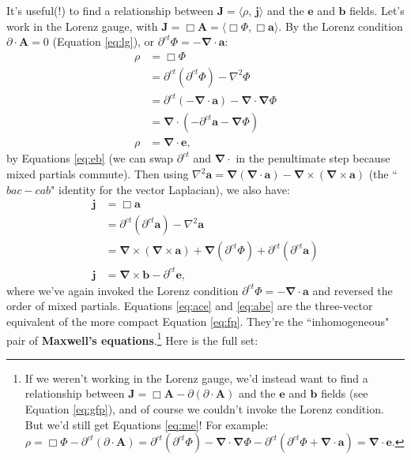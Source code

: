 \documentclass[12pt]{article}
\renewcommand{\vv}[1]{\mathbf{#1}}
\newcommand{\del}{\boldsymbol{\nabla}}
\begin{document}
It's useful(!) to find a relationship between $\vv J = \langle \rho, \, \vv j \rangle$ and the $\vv e$ and $\vv b$ fields. Let's work in the Lorenz gauge, with $\vv J= \Box \vv A = \langle \Box \Phi, \Box \vv a \rangle$. By the Lorenz condition ${\partialup \cdot \vv A = 0}$ (Equation \ref{eq:lg}), or $\partial^{ct} \Phi = - \del \cdot \vv a$:
\begin{equation}\label{eq:ace}
\begin{split}
\rho &= \Box \Phi \\
&= \partial^{ct} (\partial^{ct} \Phi) - \nabla ^2 \Phi \\
&= \partial^{ct} (- \del \cdot \vv a) - \del \cdot \del \Phi \\
&= \del \cdot (- \partial^{ct} \vv a - \del \Phi) \\
\rho &= \del \cdot \vv e ,
\end{split}
\end{equation}
by Equations \ref{eq:eb} (we can swap $\partial^{ct}$ and $\del \cdot$ in the penultimate step because mixed partials commute). Then using ${\nabla ^2 \vv a = \del(\del \cdot \vv a) - \del \times (\del \times \vv a)}$ (the ``$bac - cab$" identity for the vector Laplacian), we also have:
\begin{equation}\label{eq:abe}
\begin{split}
\vv j &= \Box \vv a \\
&= \partial^{ct} (\partial^{ct} \vv a) - \nabla ^2 \vv a \\
&= \del \times (\del \times \vv a) + \del(\partial^{ct} \Phi) + \partial^{ct} (\partial^{ct} \vv a) \\
\vv j &=  \del \times \vv b - \partial^{ct} \vv e ,
\end{split}
\end{equation}
where we've again invoked the Lorenz condition $\partial^{ct} \Phi = - \del \cdot \vv a$ and reversed the order of mixed partials. Equations \ref{eq:ace} and \ref{eq:abe} are the three-vector equivalent of the more compact Equation \ref{eq:fp}. They're the ``inhomogeneous" pair of \textbf{Maxwell's equations}.\footnote{If we weren't working in the Lorenz gauge, we'd instead want to find a relationship between $\vv J = \Box \vv A - \partialup (\partialup \cdot \vv A)$ and the $\vv e$ and $\vv b$ fields (see Equation \ref{eq:gfp}), and of course we couldn't invoke the Lorenz condition. But we'd still get Equations \ref{eq:me}! For example: $\rho = \Box \Phi - \partial^{ct}(\partialup \cdot \vv A) = \partial^{ct} (\partial^{ct} \Phi) - \del \cdot \del \Phi - \partial^{ct} (\partial^{ct} \Phi + \del \cdot \vv a) = \del \cdot \vv e$.} Here is the full set:
\end{document}
